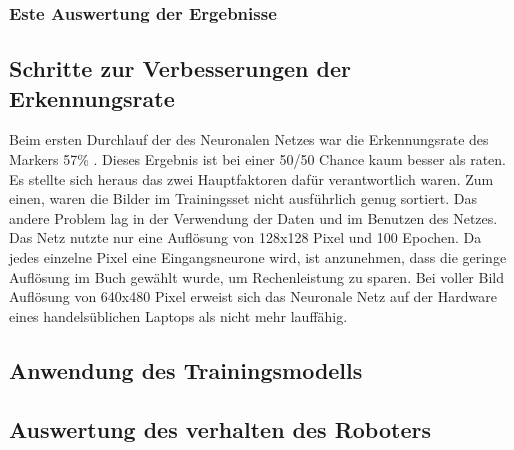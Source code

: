 \documentclass[conference]{IEEEtran}
\begin{document}
	\subsubsection{Este Auswertung der Ergebnisse}	%
	\subsection{Schritte zur Verbesserungen der Erkennungsrate} %
	Beim ersten Durchlauf der des Neuronalen Netzes war die Erkennungsrate des Markers 57\% . Dieses Ergebnis ist bei einer 50/50 Chance kaum besser als raten. Es stellte sich heraus das zwei Hauptfaktoren dafür verantwortlich waren. Zum einen, waren die Bilder im Trainingsset nicht ausführlich genug sortiert. Das andere Problem lag in der Verwendung der Daten und im Benutzen des Netzes.  Das Netz nutzte nur eine Auflösung von 128x128 Pixel und 100 Epochen. Da jedes einzelne Pixel eine Eingangsneurone wird, ist anzunehmen,  dass die geringe Auflösung im Buch gewählt wurde, um Rechenleistung zu sparen. Bei voller Bild Auflösung von 640x480 Pixel erweist sich das Neuronale Netz auf der Hardware eines handelsüblichen Laptops als nicht mehr lauffähig. 
	
	\subsection{Anwendung des Trainingsmodells } %
	\subsection {Auswertung des verhalten des Roboters}	%
	
\end{document}
